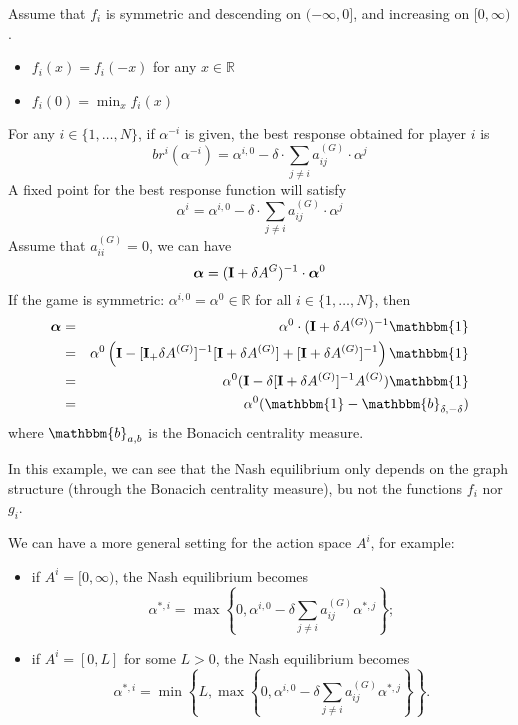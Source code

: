 Assume that $f_i$ is symmetric and descending on $(-\infty, 0]$, and increasing on $[0, \infty)$.
	\begin{itemize}
		\item $f_i(x) = f_i(-x)$ for any $x \in \mathbb{R}$
		\item $f_i(0) = \min_x f_i(x)$
	\end{itemize}
For any $i \in \{1,\ldots,N \}$, if $\alpha^{-i}$ is given, the best response obtained for player $i$ is
\begin{equation}
	br^{i}(\alpha^{-i}) = \alpha^{i,0} - \delta\cdot \sum_{j \neq i} a_{ij}^{(G)} \cdot \alpha^j
\label{eq:best_response_player_i}
\end{equation}
A fixed point for the best response function will satisfy
$$
	\alpha^{i} = \alpha^{i,0} - \delta \cdot \sum_{j \neq i} a_{ij}^{(G)} \cdot \alpha^j
$$
Assume that $a_{ii}^{(G)} = 0$, we can have
$$
	\boldsymbol{\alpha} = (\mathbf{I} + \delta A^{G})^{-1} \cdot \boldsymbol{\alpha}^0
$$
If the game is symmetric: $\alpha^{i,0} = \alpha^{0} \in \mathbb{R}$ for all $i \in \{1,\ldots, N\}$, then 
\begin{eqnarray}
	\balpha &=& \alpha^{0} \cdot (\bI + \delta A^{(G)})^{-1} \mathbbm{1} \nonumber \\
	&=&  \alpha^0 \left( \bI - [\bI _+ \delta A^{(G)}]^{-1} [\bI + \delta A^{(G)}] + [\bI + \delta A^{(G)}]^{-1} \right) \mathbbm{1} \nonumber \\
	&=& \alpha^0 (\bI - \delta [\bI + \delta A^{(G)}]^{-1} A^{(G)} ) \mathbbm{1} \nonumber \\
	&=& \alpha^0 ( \mathbbm{1} - \mathbbm{b}_{\delta, -\delta})
\end{eqnarray}
where $\mathbbm{b}_{a,b}$ is the Bonacich centrality measure.

\begin{remark}
In this example, we can see that the Nash equilibrium only depends on the graph structure (through the Bonacich centrality measure), bu not the functions $f_i$ nor $g_i$.
\end{remark}

\begin{remark}
We can have a more general setting for the action space $A^i$, for example:
\begin{itemize}
	\item if $A^{i} = [0, \infty)$, the Nash equilibrium becomes
		$$
			\alpha^{*,i} = \max \left\{0, \alpha^{i,0} - \delta \sum_{j \neq i} a_{ij}^{(G)} \alpha^{*,j} \right\};
		$$
	\item if $A^{i} = [0, L]$ for some $L>0$, the Nash equilibrium becomes
	$$
	\alpha^{*,i} = \min \left\{ L, \max \left\{0, \alpha^{i,0} - \delta \sum_{j \neq i} a_{ij}^{(G)} \alpha^{*,j} \right\} \right\}.
	$$
\end{itemize}
\end{remark}


